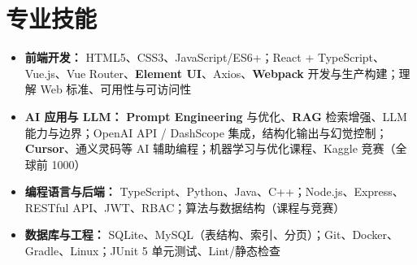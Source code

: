 \documentclass[a4paper]{article}
\begin{document}
\section{专业技能}
\begin{itemize}
    \item \textbf{前端开发：} HTML5、CSS3、JavaScript/ES6+；React + TypeScript、Vue.js、Vue Router、\textbf{Element UI}、Axios、\textbf{Webpack} 开发与生产构建；理解 Web 标准、可用性与可访问性

    \item \textbf{AI 应用与 LLM：} \textbf{Prompt Engineering} 与优化、\textbf{RAG} 检索增强、LLM 能力与边界；OpenAI API / DashScope 集成，结构化输出与幻觉控制；\textbf{Cursor}、通义灵码等 AI 辅助编程；机器学习与优化课程、Kaggle 竞赛（全球前 1000）

    \item \textbf{编程语言与后端：} TypeScript、Python、Java、C++；Node.js、Express、RESTful API、JWT、RBAC；算法与数据结构（课程与竞赛）

    \item \textbf{数据库与工程：} SQLite、MySQL（表结构、索引、分页）；Git、Docker、Gradle、Linux；JUnit 5 单元测试、Lint/静态检查
\end{itemize}
\end{document}
